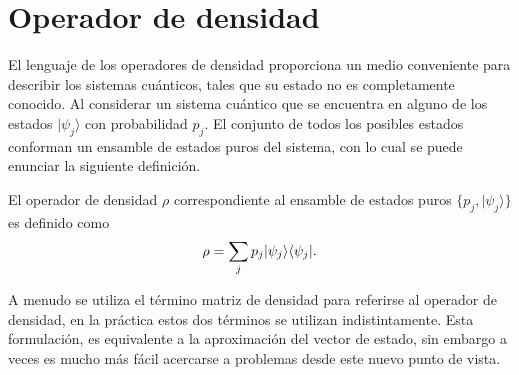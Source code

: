 \section{Operador de densidad}\label{sec:OpDensidad}%
El lenguaje de los operadores de densidad proporciona un  medio conveniente
para describir los sistemas cuánticos, tales que su estado no es completamente
conocido. Al considerar un sistema cuántico que se encuentra en alguno de los
estados $|\psi_j \rangle $ con probabilidad $p_j$. El conjunto de todos los
posibles estados conforman un ensamble de estados puros del sistema, con lo
cual se puede enunciar la siguiente definición. 

\begin{definition} El operador de densidad
$\rho$ correspondiente al ensamble de estados puros $\{p_j,|\psi_j \rangle \}$
es definido como {\cite{wilde2011classical}}
  	\begin{equation}{\label{defdensityoperator}}
  		\rho=\sum_{j}p_j|\psi_j\rangle \langle \psi_j|.
  	\end{equation}
\end{definition}
A menudo se utiliza el término matriz de densidad para referirse al operador de
densidad, en la práctica estos dos términos se utilizan indistintamente. Esta
formulación, es equivalente a la aproximación del vector de estado, sin embargo
a veces es mucho más fácil acercarse a problemas desde este nuevo punto de
vista.
 

